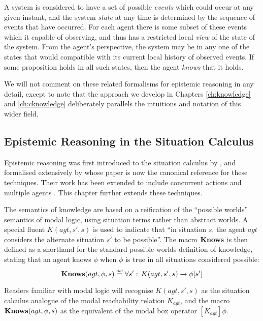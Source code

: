 A system is considered to have a set of possible \emph{events} which
could occur at any given instant, and the system \emph{state} at any
time is determined by the sequence of events that have occurred. For
each agent there is some subset of these events which it capable of
observing, and thus has a restricted local \emph{view} of the state
of the system. From the agent's perspective, the system may be in
any one of the states that would compatible with its current local
history of observed events. If some proposition holds in all such
states, then the agent \emph{knows} that it holds.

We will not comment on these related formalisms for epistemic reasoning
in any detail, except to note that the approach we develop in Chapters
\ref{ch:knowledge} and \ref{ch:cknowledge} deliberately parallels
the intuitions and notation of this wider field.


\subsection{Epistemic Reasoning in the Situation Calculus}

Epistemic reasoning was first introduced to the situation calculus
by \citet{moore80know_act}, and formalised extensively by \citet{scherl03sc_knowledge}
whose paper is now the canonical reference for these techniques. Their
work has been extended to include concurrent actions \citep{scherl03conc_knowledge}
and multiple agents \citep{shapiro98specifying_ma_systems}. This
chapter further extends these techniques.

The semantics of knowledge are based on a reification of the {}``possible
worlds'' semantics of modal logic, using situation terms rather than
abstract worlds. A special fluent $K(agt,s',s)$ is used to indicate
that {}``in situation $s$, the agent $agt$ considers the alternate
situation $s'$ to be possible''. The macro $\mathbf{Knows}$ is then defined
as a shorthand for the standard possible-worlds definition of knowledge,
stating that an agent knows $\phi$ when $\phi$ is true in all situations
considered possible: \begin{equation}
\mathbf{Knows}(agt,\phi,s)\stackrel{\mbox{\tiny def}}{=}\forall s':\, K(agt,s',s)\rightarrow\phi[s']\label{eqn:Knowledge:knows_def}\end{equation}


Readers familiar with modal logic will recognise $K(agt,s',s)$ as
the situation calculus analogue of the modal reachability relation
$K_{agt}$, and the macro $\mathbf{Knows}(agt,\phi,s)$ as the equivalent
of the modal box operator $[K_{agt}]\phi$.

